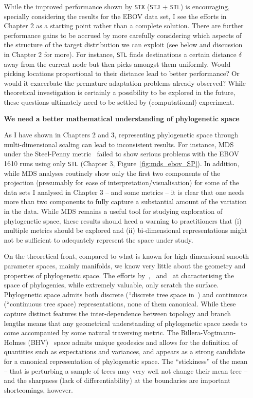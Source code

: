 While the improved performance shown by \verb|STX| (\verb|STJ| + \verb|STL|) is encouraging, specially considering the results for the EBOV data set, I see the efforts in Chapter 2 as a starting point rather than a complete solution.
There are further performance gains to be accrued by more carefully considering which aspects of the structure of the target distribution we can exploit (see below and discussion in Chapter 2 for more).
For instance, \verb|STL| finds destinations a certain distance $\delta$ away from the current node but then picks amongst them uniformly. 
Would picking locations proportional to their distance lead to better performance? Or would it exacerbate the premature adaptation problems already observed?
While theoretical investigation is certainly a possibility to be explored in the future, these questions ultimately need to be settled by (computational) experiment.


\textbf{We need a better mathematical understanding of phylogenetic space} 

As I have shown in Chapters 2 and 3, representing phylogenetic space through multi-dimensional scaling can lead to inconsistent results.
For instance, MDS under the Steel-Penny metric~\citep{Steel1993} failed to show serious problems with the EBOV 1610 runs using only \verb|STL| (Chapter 3, Figure~\ref{fig:mds_ebov_SP}).
In addition, while MDS analyses routinely show only the first two components of the projection (presumably for ease of interpretation/visualisation) for some of the data sets I analysed in Chapter 3 -- and some metrics -- it is clear that one needs more than two components to fully capture a substantial amount of the variation in the data.
While MDS remains a useful tool for studying exploration of phylogenetic space, these results should heed a warning to practitioners that (i) multiple metrics should be explored and (ii) bi-dimensional representations might not be sufficient to  adequately represent the space under study.

On the theoretical front, compared to what is known for high dimensional smooth parameter spaces, mainly manifolds, we know very little about the geometry and properties of phylogenetic space.
The efforts by~\cite{Billera2001},~\cite{Gavryushkin2016} and~\cite{Whidden2017} at characterising the space of phylogenies, while extremely valuable, only scratch the surface.
Phylogenetic space admits both discrete (``discrete tree space in~\cite{StJohn2017}) and continuous (``continuous tree space) representations, none of them canonical.
While these capture distinct features the inter-dependence between topology and branch lengths means that any geometrical understanding of phylogenetic space needs to come accompanied by some natural traversing metric.
The Billera-Vogtmann-Holmes (BHV)~\citep{Billera2001} space admits unique geodesics and allows for the definition of quantities such as expectations and variances, and appears as a strong candidate for a canonical representation of phylogenetic space.
The ``stickiness''  of the mean -- that is perturbing a sample of trees may very well not change their mean tree -- and the sharpness (lack of differentiability) at the boundaries are important shortcomings, however. 

